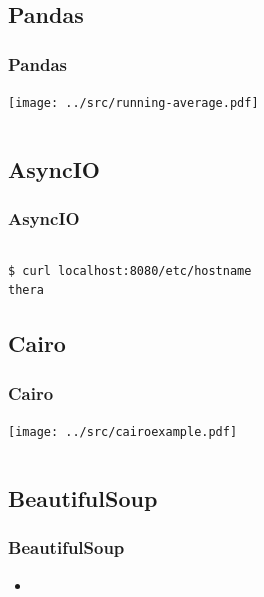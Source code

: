 \subsection{Pandas}
\begin{frame}
    \frametitle{Pandas}
    \vspace{3mm}
    \hspace{105mm}\texttt{[image: ../src/running-average.pdf]}
    \vspace{-73mm}\inputminted[fontsize=\footnotesize]{python}{../src/pandas-example.py}
\end{frame}

\subsection{AsyncIO}
\begin{frame}[fragile]
    \frametitle{AsyncIO}
    \vspace{-2mm}
    \inputminted[fontsize=\tiny]{python3}{../src/webserver.py}
    \pause
    \vspace{2mm}
    {\tiny
    \begin{verbatim}
$ curl localhost:8080/etc/hostname
thera
    \end{verbatim}
    }
\end{frame}

\subsection{Cairo}
\begin{frame}
    \frametitle{Cairo}
    \vspace{10mm}
    \hspace{105mm}\texttt{[image: ../src/cairoexample.pdf]}
    \vspace{-75mm}\inputminted[fontsize=\footnotesize]{python}{../src/cairoexample.py}
\end{frame}

\subsection{BeautifulSoup}
\begin{frame}
    \frametitle{BeautifulSoup}
    \vspace{5mm}
    
    \begin{itemize}
      \item 
    \end{itemize}
\end{frame}

